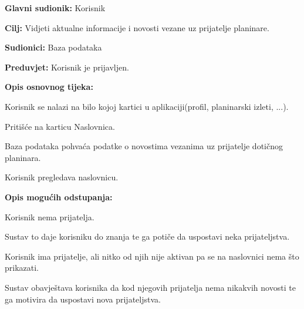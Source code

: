 		\noindent {}
		\begin{packed_item}
			
			\item \textbf{Glavni sudionik: } Korisnik
			\item  \textbf{Cilj:} Vidjeti aktualne informacije i novosti vezane uz prijatelje planinare.
			\item  \textbf{Sudionici:} Baza podataka
			\item  \textbf{Preduvjet:} Korisnik je prijavljen. 
			\item  \textbf{Opis osnovnog tijeka:}
			
			\item[] \begin{packed_enum}
				
				\item Korisnik se nalazi na bilo kojoj kartici u aplikaciji(profil, planinarski izleti, ...).
				\item Pritišće na karticu Naslovnica.
				\item Baza podataka pohvaća podatke o novostima vezanima uz prijatelje dotičnog planinara.
				\item Korisnik pregledava naslovnicu.
				
			\end{packed_enum}
			
			\item  \textbf{Opis mogućih odstupanja:}
			
			\item[] \begin{packed_item}
				
				\item[3.a] Korisnik nema prijatelja. 
				\item[] \begin{packed_enum}
					
					\item Sustav to daje korisniku do znanja te ga potiče da uspostavi neka prijateljstva.
				\end{packed_enum}
			
				\item[3.b] Korisnik ima prijatelje, ali nitko od njih nije aktivan pa se na naslovnici nema što prikazati. 
				\item[] \begin{packed_enum}
					
					\item Sustav obavještava korisnika da kod njegovih prijatelja nema nikakvih novosti te ga motivira da uspostavi nova prijateljstva.
				\end{packed_enum}
				
				
			\end{packed_item}
		\end{packed_item}
		
